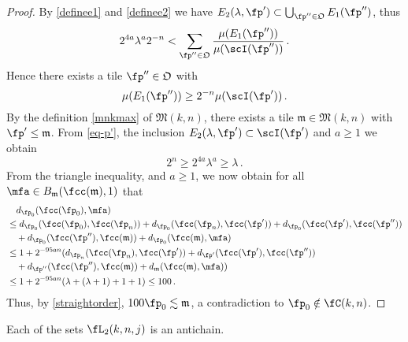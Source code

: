 \begin{proof}
    By \eqref{definee1} and \eqref{definee2} we have $E_2(\lambda, \fp') \subset \bigcup_{\fp'' \in \mathfrak{O}} E_1(\fp'')$, thus
    $$
        2^{4a}\lambda^a 2^{-n} < \sum_{\fp'' \in \mathfrak{O}} \frac{\mu(E_1(\fp''))}{\mu(\scI(\fp''))}\,.
    $$
    Hence there exists a tile $\fp'' \in \mathfrak{O}$ with
    \begin{equation*}
        \mu(E_1(\fp'')) \ge 2^{-n} \mu(\scI(\fp'))\,.
    \end{equation*}
    By the definition \eqref{mnkmax} of $\mathfrak{M}(k,n)$, there exists a tile $\mathfrak{m} \in \mathfrak{M}(k,n)$ with $\fp' \leq \mathfrak{m}$. From \eqref{eq-p'}, the inclusion $E_2(\lambda, \fp') \subset \scI(\fp')$ and $a\ge 1$ we obtain
    $$
        2^n \geq 2^{4a} \lambda^{a} \geq \lambda\,.
    $$
    From the triangle inequality,  and $a \ge 1$, we now obtain for all $\mfa \in B_{\mathfrak{m}}(\fcc(\mathfrak{m}), 1)$ that
    \begin{align*}
        &\quad d_{\fp_0}(\fcc(\fp_0), \mfa)\\
        &\leq d_{\fp_0}(\fcc(\fp_0), \fcc(\fp_{n})) + d_{\fp_0}(\fcc(\fp_{n}), \fcc(\fp')) + d_{\fp_0}(\fcc(\fp'), \fcc(\fp''))\\
        &\quad+ d_{\fp_0}(\fcc(\fp''), \fcc(\mathfrak{m})) +
        d_{\fp_0}(\fcc(\mathfrak{m}), \mfa)\\
        &\leq 1 + 2^{-95an} (d_{\fp_{n}}(\fcc(\fp_n), \fcc(\fp')) + d_{\fp'}(\fcc(\fp'), \fcc(\fp''))\\
        &\quad+ d_{\fp''}(\fcc(\fp''), \fcc(\mathfrak{m})) +
        d_{\mathfrak{m}}(\fcc(\mathfrak{m}), \mfa))\\
        &\leq 1 + 2^{-95an}(\lambda + (\lambda + 1) + 1 + 1) \leq 100\,.
    \end{align*}
    Thus, by \eqref{straightorder}, $100\fp_0 \lesssim \mathfrak{m}$, a contradiction to $\fp_0 \notin \fC(k,n)$.
\end{proof}

\begin{lemma}[L2 antichain]
\label{L2-antichain}
\leanok
{}
    Each of the sets $\fL_2(k,n,j)$ is an antichain.
\end{lemma}

